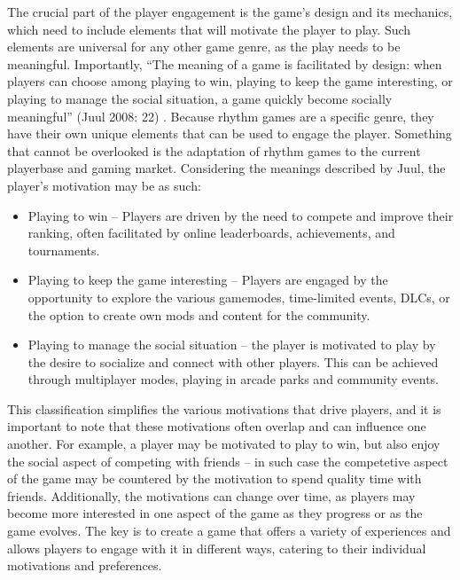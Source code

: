 The crucial part of the player engagement is the game’s design and its mechanics, which need to include elements that will motivate the player to play. Such elements are universal for any other game genre, as the play needs to be meaningful. Importantly, ``The meaning of a game is facilitated by design: when players can choose among playing to win, playing to keep the game interesting, or playing to manage the social situation, a game quickly become socially meaningful'' (Juul 2008: 22) \cite{casualrevolution}. Because rhythm games are a specific genre, they have their own unique elements that can be used to engage the player. Something that cannot be overlooked is the adaptation of rhythm games to the current playerbase and gaming market. Considering the meanings described by Juul, the player’s motivation may be as such:
\begin{itemize}
\item Playing to win -- Players are driven by the need to compete and improve their ranking, often facilitated by online leaderboards, achievements, and tournaments.
\item Playing to keep the game interesting -- Players are engaged by the opportunity to explore the various gamemodes, time-limited events, DLCs, or the option to create own mods and content for the community.
\item Playing to manage the social situation -- the player is motivated to play by the desire to socialize and connect with other players. This can be achieved through multiplayer modes, playing in arcade parks and community events.
\end{itemize}

This classification simplifies the various motivations that drive players, and it is important to note that these motivations often overlap and can influence one another. For example, a player may be motivated to play to win, but also enjoy the social aspect of competing with friends -- in such case the competetive aspect of the game may be countered by the motivation to spend quality time with friends. Additionally, the motivations can change over time, as players may become more interested in one aspect of the game as they progress or as the game evolves. The key is to create a game that offers a variety of experiences and allows players to engage with it in different ways, catering to their individual motivations and preferences.

